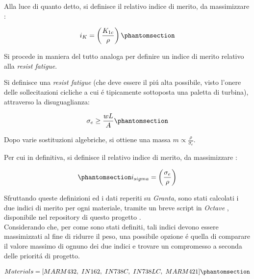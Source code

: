 \documentclass{article}
\begin{document}
        Alla luce di quanto detto, si definisce il relativo indice di merito, da massimizzare \autocite{SciencePubGroup}:

        \begin{equation}
            i_{K} = \left (\frac{K_{1c}}{\rho}\right)
            \phantomsection \label{equation:index_frac_tough}
        \end{equation}
        \clearpage 

        Si procede in maniera del tutto analoga per definire un indice di merito relativo alla 
        \textit{resist fatigue}.

        Si definisce una \textit{resist fatigue} (che deve essere il piú alta possibile,
        visto l'onere delle sollecitazioni cicliche a cui é tipicamente sottoposta una paletta di turbina), 
        attraverso la disuguaglianza:

        \begin{equation}
            \sigma_e \geq \frac{wL}{A}
            \phantomsection \label{equation:resist_fatigue}
        \end{equation}

        Dopo varie sostituzioni algebriche, si ottiene una massa $m \propto \frac{\rho}{\sigma_e}$.

        Per cui in definitiva, si definisce il relativo indice di merito, da massimizzare \autocite{SciencePubGroup}:

        \begin{equation}
            \phantomsection \label{equation:resist_fatigue_index}
            i_{sigma} = \left (\frac{\sigma_e}{\rho}\right)
        \end{equation}

        Sfruttando queste definizioni ed i dati reperiti su \textit{Granta}, 
        sono stati calcolati i due indici di merito per ogni materiale, tramite un breve script in 
        \textit{Octave} \autocite{Octave}, disponibile nel repository di questo progetto \autocite{Relazione_materiali}. \\ 

        Considerando che, per come sono stati definiti, tali indici devono essere massimizzati al fine di ridurre il peso, 
        una possibile opzione é quella di comparare il valore massimo di ognuno dei due indici e trovare un compromesso
        a seconda delle prioritá di progetto.

        \begin{equation}
            Materials = [MARM432, \ IN162, \ IN738C, \ IN738LC, \ MARM421] 
            \phantomsection \label{vector:material_list}
        \end{equation}
\end{document}
